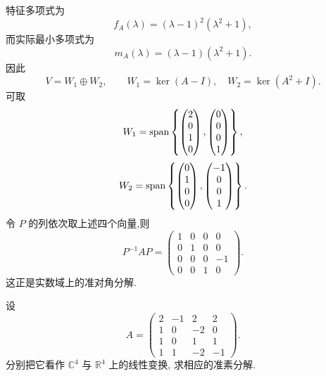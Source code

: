 \begin{solution}
特征多项式为
\[
f_A(\lambda)=(\lambda-1)^2(\lambda^2+1),
\]
而实际最小多项式为
\[
m_A(\lambda)=(\lambda-1)(\lambda^2+1).
\]
因此
\[
V=W_1\oplus W_2,
\qquad
W_1=\ker(A-I),\quad
W_2=\ker(A^2+I).
\]
可取
\[
W_1
=
\operatorname{span}\left\{
\begin{pmatrix}2\\0\\1\\0\end{pmatrix},
\begin{pmatrix}0\\0\\0\\1\end{pmatrix}
\right\},
\]
\[
W_2
=
\operatorname{span}\left\{
\begin{pmatrix}0\\1\\0\\0\end{pmatrix},
\begin{pmatrix}-1\\0\\0\\1\end{pmatrix}
\right\}.
\]
令 $P$ 的列依次取上述四个向量,则
\[
P^{-1}AP
=
\boxed{
\begin{pmatrix}
1&0&0&0\\
0&1&0&0\\
0&0&0&-1\\
0&0&1&0
\end{pmatrix}
}.
\]
这正是实数域上的准对角分解.
\end{solution}


\begin{example}
设
\[
A=
\begin{pmatrix}
2&-1&2&2\\
1&0&-2&0\\
1&0&1&1\\
1&1&-2&-1
\end{pmatrix}.
\]
分别把它看作 $\mathbb{C}^4$ 与 $\mathbb{R}^4$ 上的线性变换,
求相应的准素分解.
\end{example}
\exampleblank

